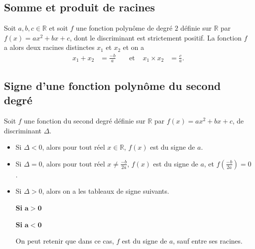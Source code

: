\documentclass[11pt]{article}
\begin{document}
\subsection{Somme et produit de racines}
\begin{propadm}
  Soit $a,b,c\in\mathbb{R}$ et soit $f$ une fonction polynôme de degré $2$
  définie sur $\mathbb{R}$ par $f(x)=ax^2+bx+c$,
  dont le discriminant est strictement positif. La fonction $f$ a alors deux
  racines distinctes $x_1$ et $x_2$ et on a
  \begin{align*}
    x_1+x_2 &= \frac{-b}{a} &
    &\text{ et }&
    x_1\times x_2 &=\frac{c}{a}.
  \end{align*}
\end{propadm}

\subsection{Signe d'une fonction polynôme du second degré}
\begin{propadm}
  Soit $f$ une fonction du second degré définie sur $\mathbb{R}$ par
    $f(x)=ax^2+bx+c$,
  de discriminant $\Delta$.
  \begin{itemize}
    \item Si $\Delta<0$, alors pour tout réel $x\in\mathbb{R}$, $f(x)$ est du
      signe de $a$.
    \item Si $\Delta=0$, alors pour tout réel $x\neq\frac{-b}{2a}$, $f(x)$ est
      du signe de $a$, et $f(\frac{-b}{2a})=0$.
    \item Si $\Delta>0$, alors on a les tableaux de signe suivants.

      \noindent
  \begin{minipage}[t]{.47\textwidth}
    \begin{center}
      {\bf Si} $\mathbf{a>0}$\vspace{.2cm}

    \end{center}
  \vspace{.2cm}
  \end{minipage}
    \hfill
  \begin{minipage}[t]{.47\textwidth}
    \begin{center}
      {\bf Si} $\mathbf{a<0}$\vspace{.2cm}

    \end{center}
  \vspace{.2cm}
  \end{minipage}
  On peut retenir que dans ce cas, $f$ est du signe de $a$, sauf entre ses
  racines.
  \end{itemize}
\end{propadm}
\end{document}

